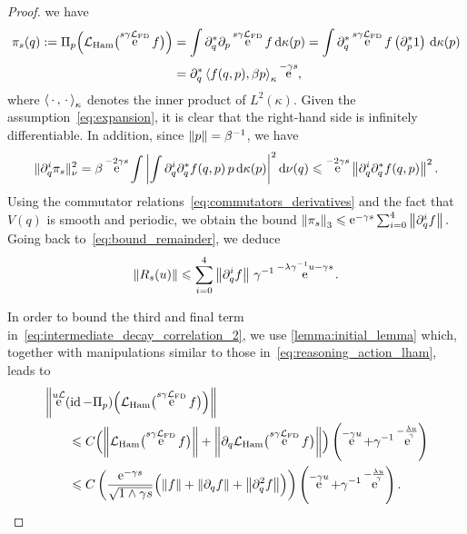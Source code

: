 \documentclass[11pt,a4paper]{article}
\DeclareMathOperator{\e}{e}
\DeclareMathOperator{\id}{id}
\newcommand{\dummy}{\,\cdot\,}
\renewcommand{\d}{\mathrm d}
\theoremstyle{plain}
\numberwithin{equation}{section}
\renewcommand{\leq}{\leqslant}
\begin{document}
\begin{proof}
    we have
    \begin{align*}
        \pi_s(q) := \Pi_p \Bigl( \mathcal L_{\rm Ham} \bigl(\e^{s \gamma \mathcal L_{\rm FD}} f\bigr) \Bigr)
        &= \int \partial_q^* \partial_p \e^{s \gamma \mathcal L_{\rm FD}} f \, \d \kappa(p)
        = \int \partial_q^* \e^{s \gamma \mathcal L_{\rm FD}} f \left(\partial_p^* 1 \right) \, \d \kappa(p) \\
        &= \partial_q^* \ip{f(q, p)}{\beta p}[\kappa] \e^{-\gamma s},
    \end{align*}
    where $\ip{\dummy}{\dummy}[\kappa]$ denotes the inner product of $L^2(\kappa)$.
    Given the assumption~\eqref{eq:expansion},
    it is clear that the right-hand side is infinitely differentiable.
    In addition, since $\norm{p} = \beta^{-1}$, we have
    \begin{align*}
        \norm*{\partial_q^i \pi_s}[\nu]^2
        = \beta \e^{-2 \gamma s} \int \left| \int \partial_q^i \partial_q^* f(q, p) \, p \, \d \kappa(p) \right|^2 \d \nu(q)
        \leq \e^{-2 \gamma s} \norm{\partial_q^i \partial_q^* f(q, p)}^2.
    \end{align*}
    Using the commutator relations~\eqref{eq:commutators_derivatives} and the fact that $V(q)$ is smooth and periodic,
    we obtain the bound
    \(
    \norm{\pi_s}[3] \leq \e^{-\gamma s} \sum_{i=0}^{4} \norm{\partial_q^i f}.
    \)
    Going back to~\eqref{eq:bound_remainder}, we deduce
    \[
        \norm{R_s(u)} \leq \sum_{i=0}^{4} \norm{\partial_q^i f} \,\gamma^{-1} \e^{-\lambda \gamma^{-1} u - \gamma s}.
    \]

    In order to bound the third and final term in~\eqref{eq:intermediate_decay_correlation_2},
    we use \cref{lemma:initial_lemma} which,
    together with manipulations similar to those in~\eqref{eq:reasoning_action_lham},
    leads to
    \begin{align*}
        &\norm{\e^{u \mathcal L} (\id - \Pi_p) \Bigl( \mathcal L_{\rm Ham} \bigl(\e^{s \gamma \mathcal L_{\rm FD}} f\bigr) \Bigr)} \\
        &\qquad \leq C \Bigl( \norm{\mathcal L_{\rm Ham} \bigl(\e^{s \gamma \mathcal L_{\rm FD}} f\bigr)} + \norm{\partial_q \mathcal L_{\rm Ham} \bigl(\e^{s \gamma \mathcal L_{\rm FD}} f\bigr)} \Bigr)
        \left(\e^{-\gamma u} + \gamma^{-1} \e^{-\frac{\lambda u}{\gamma}} \right) \\
        &\qquad \leq C \left( \frac{\e^{-\gamma s}}{\sqrt{1 \wedge \gamma s}}  \Bigl( \norm{f} + \norm{\partial_q f} + \norm{\partial_q^2 f} \Bigr) \right) \left(\e^{-\gamma u} + \gamma^{-1} \e^{-\frac{\lambda u}{\gamma}} \right).
    \end{align*}


\end{proof}
\end{document}
